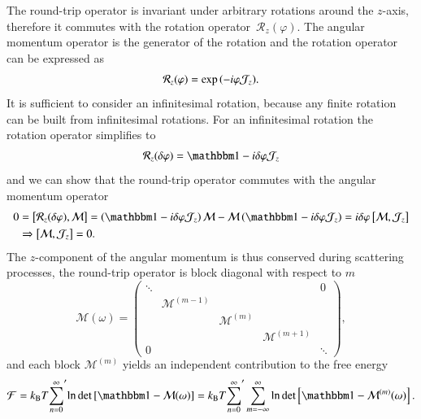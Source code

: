The round-trip operator is invariant under arbitrary rotations around the
$z$-axis, therefore it commutes with the rotation
operator~$\mathcal{R}_z(\varphi)$. The angular momentum operator is the
generator of the rotation and the rotation operator can be expressed as
\begin{equation}
\mathcal{R}_z(\varphi) = \exp{\left( -i\varphi \mathcal{J}_z \right)}.
\end{equation}
It is sufficient to consider an infinitesimal rotation, because any finite
rotation can be built from infinitesimal rotations.
For an infinitesimal rotation the rotation operator simplifies to
\begin{equation}
\mathcal{R}_z(\delta\varphi) = \Id - \imag \delta\varphi \mathcal{J}_z
\end{equation}
and we can show that the round-trip operator commutes with the angular momentum
operator
\begin{align}
0 &= \left[\mathcal{R}_z(\delta\varphi), \mathcal{M}\right]
  = \left(\Id - \imag \delta\varphi \mathcal{J}_z\right) \mathcal{M} - \mathcal{M} \left(\Id - \imag \delta\varphi \mathcal{J}_z\right)
  = \imag \delta\varphi \left[\mathcal{M}, \mathcal{J}_z\right] \\
  &\Rightarrow \left[\mathcal{M}, \mathcal{J}_z\right] = 0.
\end{align}
The $z$-component of the angular momentum is thus conserved during
scattering processes, the round-trip operator is block diagonal with respect to
$m$
\begin{equation}
\mathcal{M}(\omega) = \left(\begin{array}{ccccc}
\ddots &                     &                   &                     & 0 \\
       & \mathcal{M}^{(m-1)} &                   &                     & \\
       &                     & \mathcal{M}^{(m)} &                     & \\
       &                     &                   & \mathcal{M}^{(m+1)} & \\
0      &                     &                   &                     & \ddots
\end{array}
\right),
\end{equation}
and each block
$\mathcal{M}^{(m)}$ yields an independent contribution to the free energy
\begin{equation}
\F = \kb T {\sum_{n=0}^\infty}^\prime \log \det \left[\Id - \mathcal{M}(\omega) \right]
       = \kb T {\sum_{n=0}^\infty}^\prime \sum_{m=-\infty}^\infty \log \det \left[\Id - \mathcal{M}^{(m)}(\omega) \right].
\end{equation}



